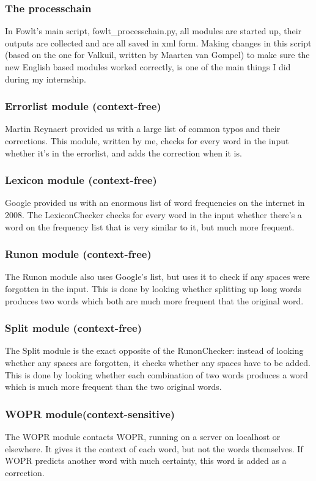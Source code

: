 \documentclass[12pt]{article}
\begin{document}
\subsubsection{The processchain}
In Fowlt's main script, fowlt\_processchain.py, all modules are started up, their outputs are collected and are all saved in xml form. Making changes in this script (based on the one for Valkuil, written by Maarten van Gompel) to make sure the new English based modules worked correctly, is one of the main things I did during my internship. 

\subsubsection{Errorlist module (context-free)}
Martin Reynaert provided us with a large list of common typos and their corrections. This module, written by me, checks for every word in the input whether it's in the errorlist, and adds the correction when it is.

\subsubsection{Lexicon module (context-free)}
Google provided us with an enormous list of word frequencies on the internet in 2008. The LexiconChecker checks for every word in the input whether there's a word on the frequency list that is very similar to it, but much more frequent.

\subsubsection{Runon module (context-free)}
The Runon module also uses Google's list, but uses it to check if any spaces were forgotten in the input. This is done by looking whether splitting up long words produces two words which both are much more frequent that the original word.

\subsubsection{Split module (context-free)}
The Split module is the exact opposite of the RunonChecker: instead of looking whether any spaces are forgotten, it checks whether any spaces have to be added. This is done by looking whether each combination of two words produces a word which is much more frequent than the two original words.

\subsubsection{WOPR module(context-sensitive)}
The WOPR module contacts WOPR, running on a server on localhost or elsewhere. It gives it the context of each word, but not the words themselves. If WOPR predicts another word with much certainty, this word is added as a correction.  
\end{document}
